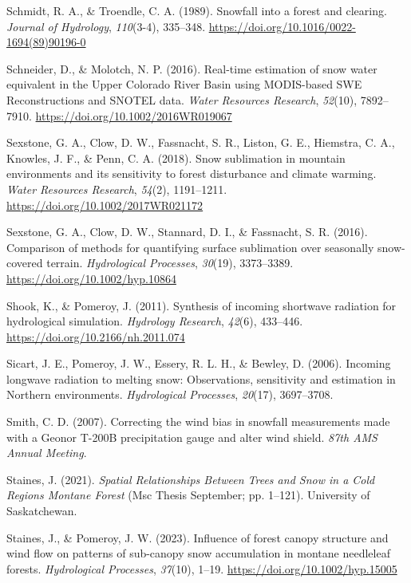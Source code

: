 \documentclass[
  letterpaper,
]{tex/uofsthesis-cs}
\newlength{\cslhangindent}
\newenvironment{CSLReferences}[2] %
 {\begin{list}{}{%
  \setlength{\itemindent}{0pt}
  \setlength{\leftmargin}{0pt}
  \setlength{\parsep}{0pt}
  \ifodd #1
   \setlength{\leftmargin}{\cslhangindent}
   \setlength{\itemindent}{-1\cslhangindent}
  \fi
  \setlength{\itemsep}{#2\baselineskip}}}
 {\end{list}}
\begin{document}
\begin{CSLReferences}{1}{0}
Schmidt, R. A., \& Troendle, C. A. (1989). Snowfall into a forest and
clearing. \emph{Journal of Hydrology}, \emph{110}(3-4), 335--348.
\url{https://doi.org/10.1016/0022-1694(89)90196-0}

Schneider, D., \& Molotch, N. P. (2016). Real-time estimation of snow
water equivalent in the {Upper Colorado River Basin} using {MODIS-based
SWE Reconstructions} and {SNO}TEL data. \emph{Water Resources Research},
\emph{52}(10), 7892--7910. \url{https://doi.org/10.1002/2016WR019067}

Sexstone, G. A., Clow, D. W., Fassnacht, S. R., Liston, G. E., Hiemstra,
C. A., Knowles, J. F., \& Penn, C. A. (2018). Snow sublimation in
mountain environments and its sensitivity to forest disturbance and
climate warming. \emph{Water Resources Research}, \emph{54}(2),
1191--1211. \url{https://doi.org/10.1002/2017WR021172}

Sexstone, G. A., Clow, D. W., Stannard, D. I., \& Fassnacht, S. R.
(2016). Comparison of methods for quantifying surface sublimation over
seasonally snow-covered terrain. \emph{Hydrological Processes},
\emph{30}(19), 3373--3389. \url{https://doi.org/10.1002/hyp.10864}

Shook, K., \& Pomeroy, J. (2011). Synthesis of incoming shortwave
radiation for hydrological simulation. \emph{Hydrology Research},
\emph{42}(6), 433--446. \url{https://doi.org/10.2166/nh.2011.074}

Sicart, J. E., Pomeroy, J. W., Essery, R. L. H., \& Bewley, D. (2006).
Incoming longwave radiation to melting snow: Observations, sensitivity
and estimation in {Northern} environments. \emph{Hydrological
Processes}, \emph{20}(17), 3697--3708.

Smith, C. D. (2007). Correcting the wind bias in snowfall measurements
made with a {Geonor T-200B} precipitation gauge and alter wind shield.
\emph{87th {AMS} Annual Meeting}.

Staines, J. (2021). \emph{Spatial {Relationships Between Trees} and
{Snow} in a {Cold Regions Montane Forest}} (Msc Thesis September; pp.
1--121). University of Saskatchewan.

Staines, J., \& Pomeroy, J. W. (2023). Influence of forest canopy
structure and wind flow on patterns of sub-canopy snow accumulation in
montane needleleaf forests. \emph{Hydrological Processes},
\emph{37}(10), 1--19. \url{https://doi.org/10.1002/hyp.15005}


\end{CSLReferences}
\end{document}
